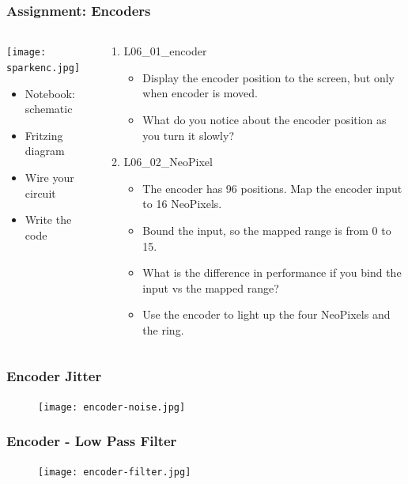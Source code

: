 \documentclass{beamer}
\begin{document}
\begin{frame}\frametitle{Assignment: Encoders}
\begin{columns}
\begin{column}{4.5cm}
\begin{center}
\texttt{[image: sparkenc.jpg]}
\end{center}
\begin{itemize}
\item Notebook: schematic
\item Fritzing diagram
\item Wire your circuit
\item Write the code
\end{itemize}
\end{column}
\begin{column}{7.5cm}
\begin{enumerate}
\item L06\_01\_encoder
	\begin{itemize}
		\item Display the encoder position to the screen, but only when encoder is moved.
		\item What do you notice about the encoder position as you turn it slowly?
	\end{itemize}
\item L06\_02\_NeoPixel
	\begin{itemize}
		\item The encoder has 96 positions. Map the encoder input to 16 NeoPixels.
		\item Bound the input, so the mapped range is from 0 to 15.
		\item What is the difference in performance if you bind the input vs the mapped range?
		\item Use the encoder to light up the four NeoPixels and the ring.	
	\end{itemize}
\end{enumerate}
\end{column}
\end{columns}

\end{frame}

\begin{frame}\frametitle{Encoder Jitter}
\begin{figure}[h]
	\texttt{[image: encoder-noise.jpg]}
\end{figure}
\end{frame}

\begin{frame}\frametitle{Encoder - Low Pass Filter}
\begin{figure}[h]
	\texttt{[image: encoder-filter.jpg]}
\end{figure}
\end{frame}
\end{document}
